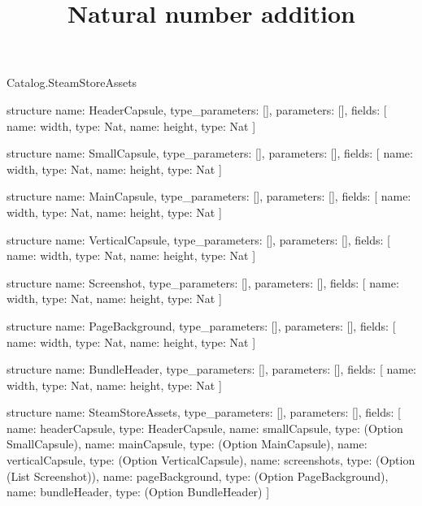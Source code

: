\begin{lexlean}{Catalog.SteamStoreAssets}
\title{Natural number addition}
\begin{semanticmodule}
structure{
  name: HeaderCapsule,
  type_parameters: [],
  parameters: [],
  fields: [
    {name: width, type: Nat},
    {name: height, type: Nat}
  ]
}

structure{
  name: SmallCapsule,
  type_parameters: [],
  parameters: [],
  fields: [
    {name: width, type: Nat},
    {name: height, type: Nat}
  ]
}

structure{
  name: MainCapsule,
  type_parameters: [],
  parameters: [],
  fields: [
    {name: width, type: Nat},
    {name: height, type: Nat}
  ]
}

structure{
  name: VerticalCapsule,
  type_parameters: [],
  parameters: [],
  fields: [
    {name: width, type: Nat},
    {name: height, type: Nat}
  ]
}

structure{
  name: Screenshot,
  type_parameters: [],
  parameters: [],
  fields: [
    {name: width, type: Nat},
    {name: height, type: Nat}
  ]
}

structure{
  name: PageBackground,
  type_parameters: [],
  parameters: [],
  fields: [
    {name: width, type: Nat},
    {name: height, type: Nat}
  ]
}

structure{
  name: BundleHeader,
  type_parameters: [],
  parameters: [],
  fields: [
    {name: width, type: Nat},
    {name: height, type: Nat}
  ]
}

structure{
  name: SteamStoreAssets,
  type_parameters: [],
  parameters: [],
  fields: [
    {name: headerCapsule, type: HeaderCapsule},
    {name: smallCapsule, type: (Option SmallCapsule)},
    {name: mainCapsule, type: (Option MainCapsule)},
    {name: verticalCapsule, type: (Option VerticalCapsule)},
    {name: screenshots, type: (Option (List Screenshot))},
    {name: pageBackground, type: (Option PageBackground)},
    {name: bundleHeader, type: (Option BundleHeader)}
  ]
}
\end{semanticmodule}
\end{lexlean}

